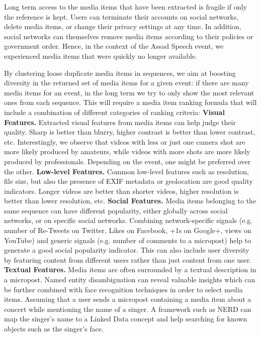 \documentclass{acm_proc_article-sp}
\begin{document}
Long term access to the media items that have been extracted is fragile if only the reference is kept. Users can terminate their accounts on social networks,
delete media items, or change their privacy settings at any time. In addition, social networks can themselves remove media items according to their policies or government order. Hence, in the context of the Assad Speech event, we experienced media items that were quickly no longer available.

By clustering loose duplicate media items in sequences, we aim at boosting diversity in the returned set of media items for a given event: if there are many media items for an event, in the long term we try to only show the most relevant ones from each sequence. This will require a media item ranking formula that will include a combination of different categories of ranking criteria:
\newline
\textbf{Visual Features.} Extracted visual features from media items can help judge their quality. Sharp is better than blurry, higher contrast is better than lower contrast, etc. Interestingly, we observe that videos with less or just one camera shot are more likely produced by amateurs, while videos with more shots are more likely produced by professionals. Depending on the event, one might be preferred over the other.
\newline
\textbf{Low-level Features.} Common low-level features such as resolution, file size, but also the presence of EXIF metadata or geolocation are good quality indicators. Longer videos are better than shorter videos, higher resolution is better than lower resolution, etc.
\newline
\textbf{Social Features.} Media items belonging to the same sequence can have different popularity, either globally across social networks, or on specific social networks. Combining network-specific signals (e.g. number of Re-Tweets on Twitter, Likes on Facebook, +1s on Google+, views on YouTube) and generic signals (e.g. number of comments to a micropost) help to generate a good social popularity indicator. This can also include user diversity by featuring content from different users rather than just content from one user.
\newline
\textbf{Textual Features.} Media items are often surrounded by a textual description in a micropost. Named entity disambiguation can reveal valuable insights which can be further combined with face recognition techniques in order to select media items. Assuming that a user sends a micropost containing a media item about a concert while mentioning the name of a singer. A framework such as NERD can map the singer's name to a Linked Data concept and help searching for known objects such as the singer's face.
\end{document}
